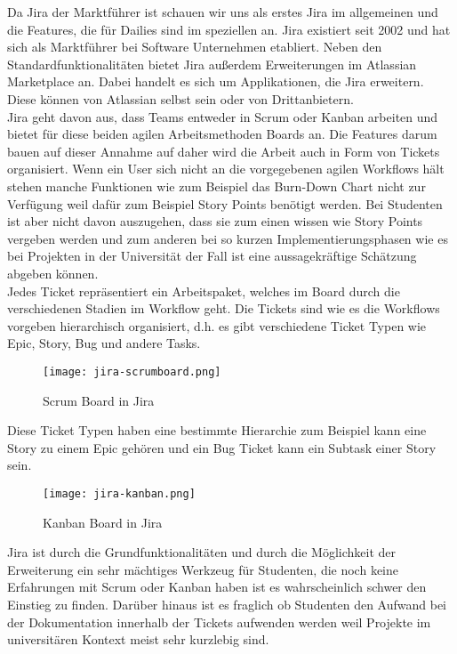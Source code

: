 Da Jira der Marktführer ist schauen wir uns als erstes Jira im allgemeinen und die Features, die für Dailies sind im speziellen an. Jira existiert seit 2002 und hat sich als Marktführer bei Software Unternehmen etabliert. Neben den Standardfunktionalitäten bietet Jira außerdem Erweiterungen im Atlassian Marketplace an. Dabei handelt es sich um Applikationen, die Jira erweitern. Diese können von Atlassian selbst sein oder von Drittanbietern.\\
Jira geht davon aus, dass Teams entweder in Scrum oder Kanban arbeiten und bietet für diese beiden agilen Arbeitsmethoden Boards an. Die Features darum bauen auf dieser Annahme auf daher wird die Arbeit auch in Form von Tickets organisiert. Wenn ein User sich nicht an die vorgegebenen agilen Workflows hält stehen manche Funktionen wie zum Beispiel das Burn-Down Chart nicht zur Verfügung weil dafür zum Beispiel Story Points benötigt werden. Bei Studenten ist aber nicht davon auszugehen, dass sie zum einen wissen wie Story Points vergeben werden und zum anderen bei so kurzen Implementierungsphasen wie es bei Projekten in der Universität der Fall ist eine aussagekräftige Schätzung abgeben können. \\
Jedes Ticket repräsentiert ein Arbeitspaket, welches im Board durch die verschiedenen Stadien im Workflow geht. Die Tickets sind wie es die Workflows vorgeben hierarchisch organisiert, d.h. es gibt verschiedene Ticket Typen wie Epic, Story, Bug und andere Tasks.

\begin{figure}[H]
	\centering
	\texttt{[image: jira-scrumboard.png]}
    \caption{Scrum Board in Jira}
	\label{fig:scrumboardjira}
\end{figure}

Diese Ticket Typen haben eine bestimmte Hierarchie zum Beispiel kann eine Story zu einem Epic gehören und ein Bug Ticket kann ein Subtask einer Story sein. 

\begin{figure}[H]
	\centering
	\texttt{[image: jira-kanban.png]}
    \caption{Kanban Board in Jira}
	\label{fig:kanbanjira}
\end{figure}

Jira ist durch die Grundfunktionalitäten und durch die Möglichkeit der Erweiterung ein sehr mächtiges Werkzeug für Studenten, die noch keine Erfahrungen mit Scrum oder Kanban haben ist es wahrscheinlich schwer den Einstieg zu finden.  Darüber hinaus ist es fraglich ob Studenten den Aufwand bei der Dokumentation innerhalb der Tickets aufwenden werden weil Projekte im universitären Kontext meist sehr kurzlebig sind.  

